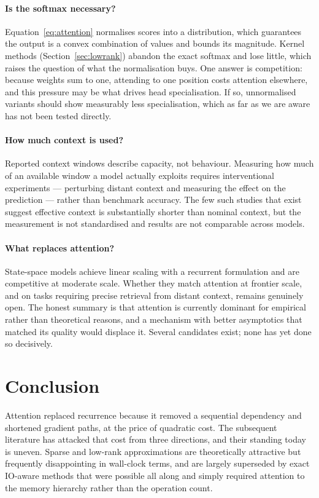 \documentclass[11pt,a4paper]{article}
\begin{document}
\paragraph{Is the softmax necessary?}
Equation~\ref{eq:attention} normalises scores into a distribution, which
guarantees the output is a convex combination of values and bounds its
magnitude. Kernel methods (Section~\ref{sec:lowrank}) abandon the exact
softmax and lose little, which raises the question of what the normalisation
buys. One answer is competition: because weights sum to one, attending to one
position costs attention elsewhere, and this pressure may be what drives head
specialisation. If so, unnormalised variants should show measurably less
specialisation, which as far as we are aware has not been tested directly.

\paragraph{How much context is used?}
Reported context windows describe capacity, not behaviour. Measuring how much
of an available window a model actually exploits requires interventional
experiments --- perturbing distant context and measuring the effect on the
prediction --- rather than benchmark accuracy. The few such studies that exist
suggest effective context is substantially shorter than nominal context, but
the measurement is not standardised and results are not comparable across
models.

\paragraph{What replaces attention?}
State-space models \cite{gu2023} achieve linear scaling with a recurrent
formulation and are competitive at moderate scale. Whether they match
attention at frontier scale, and on tasks requiring precise retrieval from
distant context, remains genuinely open. The honest summary is that attention
is currently dominant for empirical rather than theoretical reasons, and a
mechanism with better asymptotics that matched its quality would displace it.
Several candidates exist; none has yet done so decisively.

\section{Conclusion}
\label{sec:conclusion}

Attention replaced recurrence because it removed a sequential dependency and
shortened gradient paths, at the price of quadratic cost. The subsequent
literature has attacked that cost from three directions, and their standing
today is uneven. Sparse and low-rank approximations are theoretically
attractive but frequently disappointing in wall-clock terms, and are largely
superseded by exact IO-aware methods that were possible all along and simply
required attention to the memory hierarchy rather than the operation count.
\end{document}
